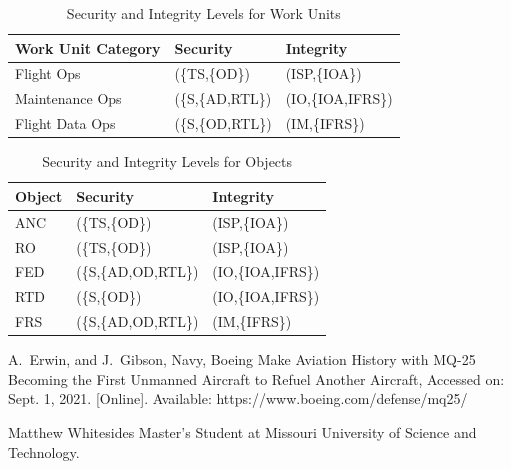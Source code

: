 \documentclass[10pt,journal,compsoc]{IEEEtran}
\begin{document}
\begin{table}[]
  \caption{Security and Integrity Levels for Work Units}
  \label{tab:security-integrity-work-units}
  \centering
  \begin{tabular}{lll}
  \hline
  \textbf{Work Unit Category} & \textbf{Security} & \textbf{Integrity} \\
  \hline
  Flight Ops                  & (\{TS,\{OD\})    & (ISP,\{IOA\})      \\
  Maintenance Ops             & (\{S,\{AD,RTL\}) & (IO,\{IOA,IFRS\})  \\
  Flight Data Ops             & (\{S,\{OD,RTL\}) & (IM,\{IFRS\})      
  \end{tabular}
\end{table}

\begin{table}[]
  \caption{Security and Integrity Levels for Objects}
  \label{tab:security-integrity-objects}
  \centering
  \begin{tabular}{lll}
  \hline
  \textbf{Object} & \textbf{Security} & \textbf{Integrity}   \\
  \hline
  ANC             & (\{TS,\{OD\})       & (ISP,\{IOA\})      \\
  RO              & (\{TS,\{OD\})       & (ISP,\{IOA\})      \\
  FED             & (\{S,\{AD,OD,RTL\}) & (IO,\{IOA,IFRS\})  \\ 
  RTD             & (\{S,\{OD\})        & (IO,\{IOA,IFRS\})  \\
  FRS             & (\{S,\{AD,OD,RTL\}) & (IM,\{IFRS\})  
  \end{tabular}
\end{table}



\ifCLASSOPTIONcaptionsoff
  \newpage
\fi

\begin{thebibliography}{1}

A.~Erwin, and J.~Gibson, Navy, Boeing Make Aviation History with MQ-25 Becoming the First Unmanned Aircraft to Refuel Another Aircraft, Accessed on: Sept. 1, 2021. [Online]. Available: https://www.boeing.com/defense/mq25/ 

\end{thebibliography}

\begin{IEEEbiographynophoto}{Matthew Whitesides}
  Master's Student at Missouri University of Science and Technology.
\end{IEEEbiographynophoto}

\end{document}
